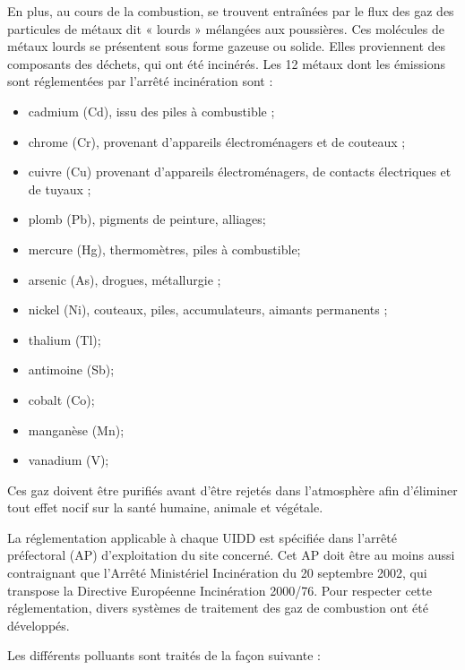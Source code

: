 En plus, au cours de la combustion, se trouvent entraînées par le flux des gaz des particules de métaux dit « lourds » mélangées aux poussières. Ces molécules de métaux lourds se présentent sous forme gazeuse ou solide. Elles proviennent des composants des déchets, qui ont été incinérés. Les 12 métaux dont les émissions sont réglementées par l’arrêté incinération sont :

\begin{itemize}
\item cadmium (Cd), issu des piles à combustible ; 
\item chrome (Cr), provenant d'appareils électroménagers et de couteaux ;
\item cuivre (Cu) provenant d'appareils électroménagers, de contacts électriques et de tuyaux ;
\item plomb (Pb), pigments de peinture, alliages;
\item mercure (Hg), thermomètres, piles à combustible;
\item arsenic (As), drogues, métallurgie ;
\item nickel (Ni), couteaux, piles, accumulateurs, aimants permanents ;
\item thalium (Tl);
\item antimoine (Sb);
\item cobalt (Co);
\item manganèse (Mn);
\item vanadium (V);
\end{itemize}

Ces gaz doivent être purifiés avant d'être rejetés dans l'atmosphère afin d'éliminer tout effet nocif sur la santé humaine, animale et végétale.
\vspace{0.3cm}


La réglementation applicable à chaque UIDD est spécifiée dans l’arrêté préfectoral (AP) d’exploitation du site concerné. Cet AP doit être au moins aussi contraignant que l’Arrêté Ministériel Incinération du 20 septembre 2002, qui transpose la Directive Européenne Incinération 2000/76. Pour respecter cette réglementation, divers systèmes de traitement des gaz de combustion ont été développés.

Les différents polluants sont traités de la façon suivante :

